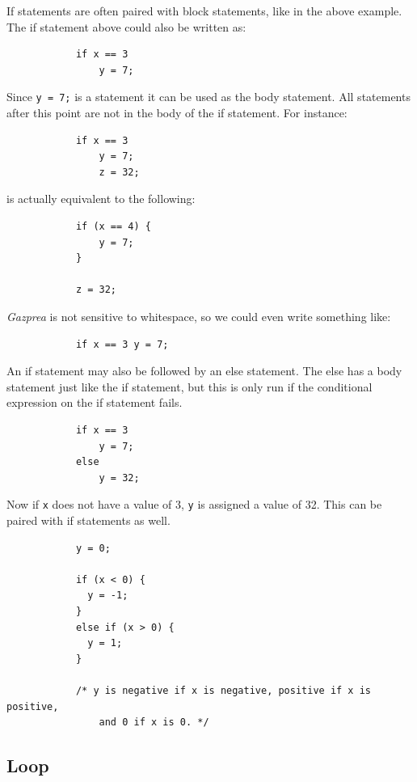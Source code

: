 \documentclass{article}
\begin{document}
		If statements are often paired with block statements, like in the above example. The if statement above could
		also be written as:

		\begin{lstlisting}
			if x == 3
				y = 7;
		\end{lstlisting}

		Since \texttt{y = 7;} is a statement it can be used as the body statement. All statements after this point are
		not in the body of the if statement. For instance:

		\begin{lstlisting}
			if x == 3
				y = 7;
				z = 32;
		\end{lstlisting}

		is actually equivalent to the following:

		\begin{lstlisting}
			if (x == 4) {
				y = 7;
			}

			z = 32;
		\end{lstlisting}

		\textit{Gazprea} is not sensitive to whitespace, so we could even write something like:

		\begin{lstlisting}
			if x == 3 y = 7;
		\end{lstlisting}

		An if statement may also be followed by an else statement. The else has a body statement just like the if
		statement, but this is only run if the conditional expression on the if statement fails.

		\begin{lstlisting}
			if x == 3
				y = 7;
			else
				y = 32;
		\end{lstlisting}

		Now if \texttt{x} does not have a value of 3, \texttt{y} is assigned a value of 32. This can be paired with if
		statements as well.

		\begin{lstlisting}
			y = 0;

			if (x < 0) {
			  y = -1;
			}
			else if (x > 0) {
			  y = 1;
			}

			/* y is negative if x is negative, positive if x is positive,
				and 0 if x is 0. */
		\end{lstlisting}


	\subsection{Loop}\label{sec:loop}
\end{document}
